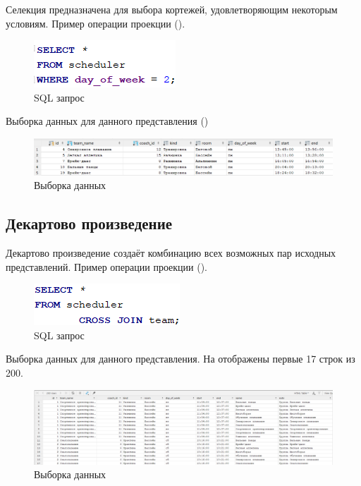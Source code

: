 \documentclass[a4paper,14pt]{article}
\begin{document}
	 Селекция предназначена для выбора кортежей, удовлетворяющим некоторым условиям.
	 Пример операции проекции ().
	 
	 \begin{figure}[H]
	 	\centering		
	 	\includegraphics[width=0.4\linewidth]{image/4_020}
	 	\caption{SQL запрос}\label{img:4_020}
	 \end{figure}
	 
	 Выборка данных для данного представления ()
	 
	 \begin{figure}[H]
	 	\centering		
	 	\includegraphics[width=0.9\linewidth]{image/4_021}
	 	\caption{Выборка данных}\label{img:4_021}
	 \end{figure}

 \subsection{Декартово произведение}

	Декартово произведение создаёт комбинацию всех возможных пар исходных представлений.
	Пример операции проекции ().
	
	\begin{figure}[H]
		\centering		
		\includegraphics[width=0.4\linewidth]{image/4_030}
		\caption{SQL запрос}\label{img:4_030}
	\end{figure}
	
	Выборка данных для данного представления.
	На  отображены первые 17 строк из 200.
	
	\begin{figure}[H]
		\centering		
		\includegraphics[width=0.9\linewidth]{image/4_031}
		\caption{Выборка данных}\label{img:4_031}
	\end{figure}
\end{document}

